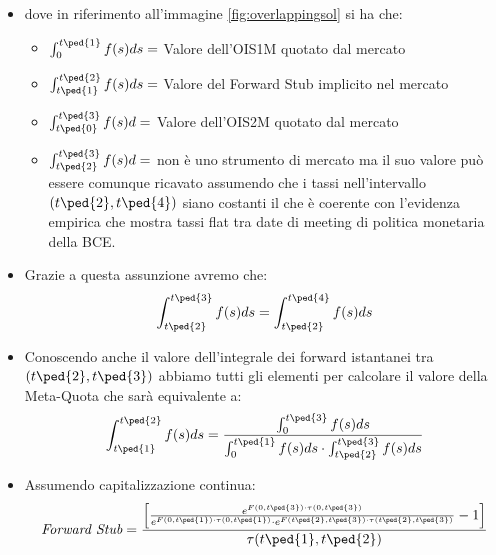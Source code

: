 \begin{frame}
\begin{itemize}
\item dove in riferimento all'immagine \ref{fig:overlappingsol} si ha che:
   \begin{itemize}
   \item $\int_{0}^{t\ped{1}} f(s)ds =$ Valore dell'OIS1M quotato dal mercato
   \item $\int_{t\ped{1}}^{t\ped{2}} f(s)ds =$ Valore del Forward Stub implicito nel mercato 
   \item $\int_{t\ped{0}}^{t\ped{3}} f(s)d =$ Valore dell'OIS2M quotato dal mercato
   \item $\int_{t\ped{2}}^{t\ped{3}} f(s)d =$ non è uno strumento di mercato ma il suo valore può essere comunque ricavato assumendo che i tassi nell'intervallo $(t\ped{2},t\ped{4})$ siano costanti il che è coerente con l'evidenza empirica che mostra tassi flat tra date di meeting di politica monetaria della BCE.
   \end{itemize}
\item Grazie a questa assunzione avremo che:
$$\int_{t\ped{2}}^{t\ped{3}} f(s)ds = \int_{t\ped{2}}^{t\ped{4}} f(s)ds$$ 
\end{itemize}
\end{frame}
\begin{frame}
\begin{itemize}
\item Conoscendo anche il valore dell'integrale dei forward istantanei tra $(t\ped{2},t\ped{3})$ abbiamo tutti gli elementi per calcolare il valore della Meta-Quota che sarà equivalente a:
$$\int_{t\ped{1}}^{t\ped{2}} f(s)ds = \frac{\int_{0}^{t\ped{3}} f(s)ds}{\int_{0}^{t\ped{1}} f(s)ds \cdot \int_{t\ped{2}}^{t\ped{3}} f(s)ds}$$
\item Assumendo capitalizzazione continua:
$$\mbox{{\it Forward Stub}} = \frac{\left[\frac{e^{F(0,t\ped{3}) \cdot \tau(0,t\ped{3})}}{e^{F(0,t\ped{1}) \cdot \tau(0,t\ped{1})} \cdot e^{F(t\ped{2},t\ped{3}) \cdot \tau(t\ped{2},t\ped{3})}}-1\right]}{\tau(t\ped{1},t\ped{2})}$$ 
\end{itemize}
\end{frame}
